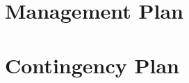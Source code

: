 \documentclass[12pt,conference,onecolumn]{IEEEtran} %
\begin{document}
\section{Management Plan}

\section{Contingency Plan}



\pagebreak
\printbibliography{}
\end{document}
